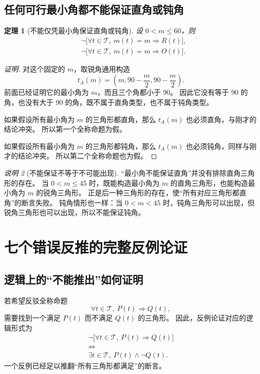 \documentclass[UTF8,a4paper,zihao=-4,oneside,openany,fontset=fandol]{ctexbook}
\newtheorem{theorem}{定理}[chapter]
\theoremstyle{definition}
\theoremstyle{remark}
\newtheorem{remark}[theorem]{说明}
\begin{document}
\section{任何可行最小角都不能保证直角或钝角}

\begin{theorem}[不能仅凭最小角保证直角或钝角]
设 $0<m\le60$，则
\begin{align*}
&\neg\bigl[\forall t\in\mathcal T,\ m(t)=m\Longrightarrow R(t)\bigr],\\
&\neg\bigl[\forall t\in\mathcal T,\ m(t)=m\Longrightarrow O(t)\bigr].
\end{align*}
\end{theorem}

\begin{proof}[证明]
对这个固定的 $m$，取锐角通用构造
\[
t_A(m)=\left(m,90-\frac m2,90-\frac m2\right).
\]
前面已经证明它的最小角为 $m$，而且三个角都小于 $90$。
因此它没有等于 $90$ 的角，也没有大于 $90$ 的角，既不属于直角类型，也不属于钝角类型。

如果假设所有最小角为 $m$ 的三角形都直角，那么 $t_A(m)$ 也必须直角，与刚才的结论冲突。
所以第一个全称命题为假。

如果假设所有最小角为 $m$ 的三角形都钝角，那么 $t_A(m)$ 也必须钝角，同样与刚才的结论冲突。
所以第二个全称命题也为假。
\end{proof}

\begin{remark}[不能保证不等于不可能出现]
“最小角不能保证直角”并没有排除直角三角形的存在。
当 $0<m\le45$ 时，既能构造最小角为 $m$ 的直角三角形，也能构造最小角为 $m$ 的锐角三角形。
正是后一种三角形的存在，使“所有对应三角形都直角”的断言失败。
钝角情形也一样：当 $0<m<45$ 时，钝角三角形可以出现，但锐角三角形也可以出现，所以不能保证钝角。
\end{remark}

\chapter{七个错误反推的完整反例论证}
\label{math:counterexamples}

\section{逻辑上的“不能推出”如何证明}

若希望反驳全称命题
\[
\forall t\in\mathcal T,\ P(t)\Longrightarrow Q(t),
\]
需要找到一个满足 $P(t)$ 而不满足 $Q(t)$ 的三角形。
因此，反例论证对应的逻辑形式为
\[
\boxed{
\begin{gathered}
\neg\bigl[\forall t\in\mathcal T,\ P(t)\Longrightarrow Q(t)\bigr]\\
\Longleftrightarrow\\
\exists t\in\mathcal T,\ P(t)\land\neg Q(t).
\end{gathered}}
\]
一个反例已经足以推翻“所有三角形都满足”的断言。
\end{document}
